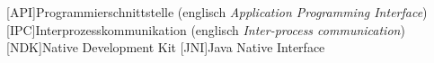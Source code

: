 
\begin{acronym}
  [API]{Programmierschnittstelle (englisch \textit{Application Programming Interface})}
  [IPC]{Interprozesskommunikation (englisch \textit{Inter-process communication})}
  [NDK]{Native Development Kit}
  [JNI]{Java Native Interface}
\end{acronym}